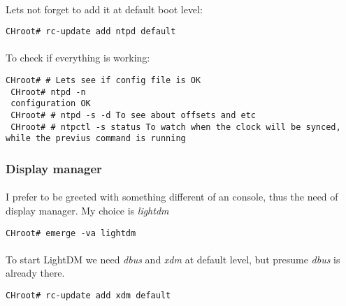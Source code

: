 \documentclass[10pt,a4paper]{article}
\begin{document}
                    \paragraph{} Lets not forget to add it at default boot level:
                    
                    \begin{lstlisting}[style=BashInputCHRoot]
 CHroot# rc-update add ntpd default
                    \end{lstlisting}
                    
                    \paragraph{} To check if everything is working:
                    
                    \begin{lstlisting}[style=BashInputCHRoot]
 CHroot# # Lets see if config file is OK
 CHroot# ntpd -n
 configuration OK
 CHroot# # ntpd -s -d To see about offsets and etc
 CHroot# # ntpctl -s status To watch when the clock will be synced, while the previus command is running
                    \end{lstlisting}

                \newpage
                \subsubsection{Display manager}

                    \paragraph{} I prefer to be greeted with something different of an console, thus the need of display manager. My choice is \textit{lightdm}

                    \begin{lstlisting}[style=BashInputCHRoot]
 CHroot# emerge -va lightdm
                    \end{lstlisting}

                    \paragraph{} To start LightDM we need \textit{dbus} and \textit{xdm} at default level, but presume \textit{dbus} is already there.

                    \begin{lstlisting}[style=BashInputCHRoot]
 CHroot# rc-update add xdm default
                    \end{lstlisting}
\end{document}
